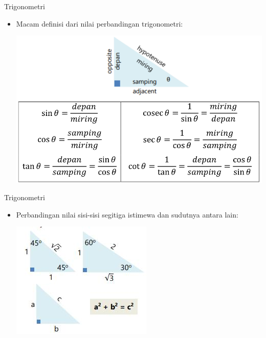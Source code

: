 \documentclass[pdflatex,compress,mathserif]{beamer}
\begin{document}
	\begin{frame}{Trigonometri}
		\begin{itemize}
			\item Macam definisi dari nilai perbandingan trigonometri:
			\begin{center}
				\includegraphics[width=0.8\linewidth]{pict/19}
			\end{center}
		\end{itemize}
	\end{frame}

	\begin{frame}{Trigonometri}
		\begin{itemize}
			\item Perbandingan nilai sisi-sisi segitiga istimewa dan sudutnya antara lain:
			\begin{center}
				\includegraphics[width=0.6\linewidth]{pict/20}
			\end{center}
		\end{itemize}
	\end{frame}
	
\end{document}
